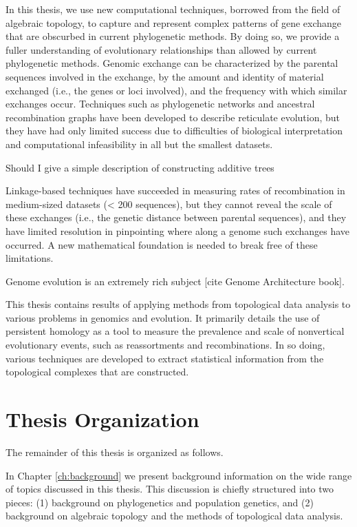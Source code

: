In this thesis, we use new computational techniques, borrowed from the field of algebraic topology, to capture and represent complex patterns of gene exchange that are obscurbed in current phylogenetic methods.
By doing so, we provide a fuller understanding of evolutionary relationships than allowed by current phylogenetic methods.
Genomic exchange can be characterized by the parental sequences involved in the exchange, by the amount and identity of material exchanged (i.e., the genes or loci involved), and the frequency with which similar exchanges occur.
Techniques such as phylogenetic networks and ancestral recombination graphs have been developed to describe reticulate evolution, but they have had only limited success due to difficulties of biological interpretation and computational infeasibility in all but the smallest datasets.

Should I give a simple description of constructing additive trees

Linkage-based techniques have succeeded in measuring rates of recombination in medium-sized datasets (< 200 sequences), but they cannot reveal the scale of these exchanges (i.e., the genetic distance between parental sequences), and they have limited resolution in pinpointing where along a genome such exchanges have occurred.
A new mathematical foundation is needed to break free of these limitations.

Genome evolution is an extremely rich subject [cite Genome Architecture book].

This thesis contains results of applying methods from topological data analysis to various problems in genomics and evolution.
It primarily details the use of persistent homology as a tool to measure the prevalence and scale of nonvertical evolutionary events, such as reassortments and recombinations.
In so doing, various techniques are developed to extract statistical information from the topological complexes that are constructed.

\section{Thesis Organization}

The remainder of this thesis is organized as follows.

In Chapter \ref{ch:background} we present background information on the wide range of topics discussed in this thesis.
This discussion is chiefly structured into two pieces: (1) background on phylogenetics and population genetics, and (2) background on algebraic topology and the methods of topological data analysis.


